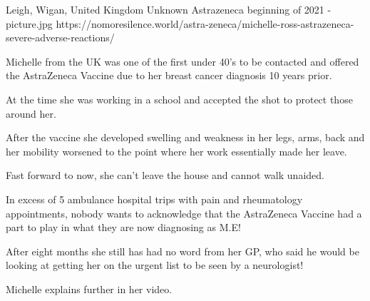 {Leigh, Wigan, United Kingdom}
{Unknown}
{Astrazeneca}
{beginning of 2021}
{-}
{picture.jpg}
{https://nomoresilence.world/astra-zeneca/michelle-ross-astrazeneca-severe-adverse-reactions/}
{

Michelle from the UK was one of the first under 40’s to be contacted and offered
the AstraZeneca Vaccine due to her breast cancer diagnosis 10 years prior.

At the time she was working in a school and accepted the shot to protect those
around her.

After the vaccine she developed swelling and weakness in her legs, arms, back
and her mobility worsened to the point where her work essentially made her
leave.

Fast forward to now, she can’t leave the house and cannot walk unaided.

In excess of 5 ambulance hospital trips with pain and rheumatology appointments,
nobody wants to acknowledge that the AstraZeneca Vaccine had a part to play in
what they are now diagnosing as M.E!

After eight months she still has had no word from her GP, who said he would be
looking at getting her on the urgent list to be seen by a neurologist!

Michelle explains further in her video.

}

